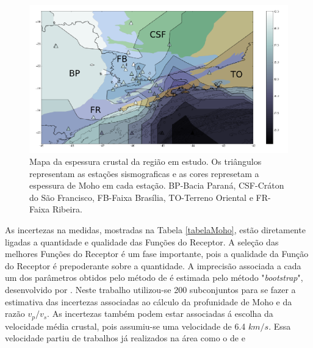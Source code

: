 \begin{figure}[!ht]
\centering
\includegraphics[scale=0.5]{Figs/Interpolacao_Linear.png}
\caption[Mapa da espessura crustal da região em estudo.]{Mapa da espessura crustal da região em estudo. Os triângulos representam as estações sismograficas e as cores represetam a espessura de Moho em cada estação. BP-Bacia Paraná, CSF-Cráton do São Francisco, FB-Faixa Brasília, TO-Terreno Oriental  e FR-Faixa Ribeira.}
\label{Interpolacao}
\end{figure}

As incertezas na medidas, mostradas na Tabela \ref{tabelaMoho}, estão diretamente ligadas a quantidade e qualidade das Funções do Receptor. A seleção das melhores Funções do Receptor é um fase importante, pois a qualidade da Função do Receptor é prepoderante sobre a quantidade. A imprecisão associada a cada um dos parâmetros obtidos pelo método de \cite{Zhu_Kanamori_2000} é estimada pelo método "\textit{bootstrap}", desenvolvido por \cite{efron_statistical_1991}. Neste trabalho utilizou-se 200  subconjuntos para se fazer a estimativa das incertezas associadas ao  cálculo da profunidade de Moho e da razão $v_{p}/v_{s}$. As incertezas também podem estar associadas á escolha da velocidade média crustal, pois assumiu-se uma velocidade de 6.4 $km/s$. Essa velocidade partiu de trabalhos já realizados na área como o de \cite{Bassini_1986} e \cite{sand_franca_crustal_2004}

